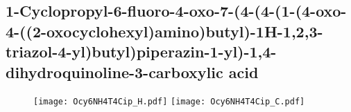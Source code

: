 \subsection{1\hyp{}Cyclopropyl\hyp{}6\hyp{}fluoro\hyp{}4\hyp{}oxo\hyp{}7\hyp{}(4\hyp{}(4\hyp{}(1\hyp{}(4\hyp{}oxo\hyp{}4\hyp{}((2\hyp{}oxocyclohexyl)amino)butyl)\hyp{}1H\hyp{}1,2,3\hyp{}triazol\hyp{}4\hyp{}yl)butyl)piperazin\hyp{}1\hyp{}yl)\hyp{}1,4\hyp{}dihydroquinoline\hyp{}3\hyp{}carboxylic acid }

\begin{figure}[H]
	\centering
		\texttt{[image: Ocy6NH4T4Cip\_H.pdf]}
		\texttt{[image: Ocy6NH4T4Cip\_C.pdf]}
\end{figure}
